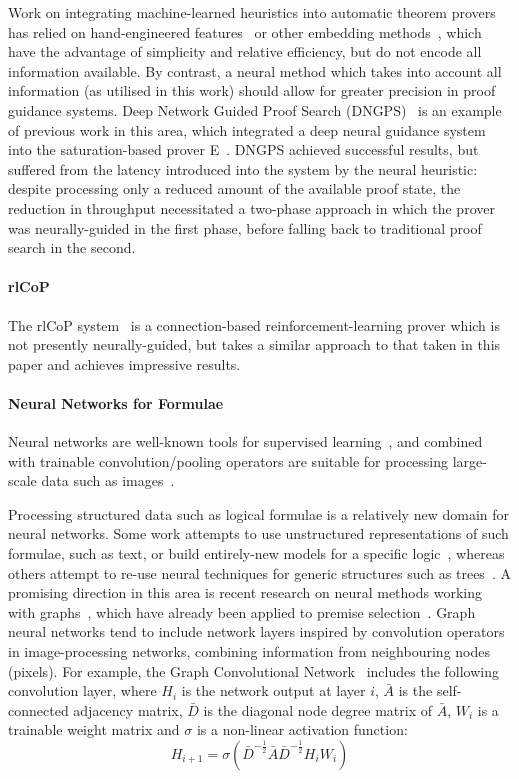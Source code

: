 \documentclass{llncs}
\begin{document}
Work on integrating machine-learned heuristics into automatic theorem provers has relied on hand-engineered features~\cite{MaLeCoP,FEMaLeCoP,rlCoP} or other embedding methods~\cite{ENIGMA}, which have the advantage of simplicity and relative efficiency, but do not encode all information available.
By contrast, a neural method which takes into account all information (as utilised in this work) should allow for greater precision in proof guidance systems.
Deep Network Guided Proof Search (DNGPS)~\cite{DNGPS} is an example of previous work in this area, which integrated a deep neural guidance system into the saturation-based prover E~\cite{E}.
DNGPS achieved successful results, but suffered from the latency introduced into the system by the neural heuristic: despite processing only a reduced amount of the available proof state, the reduction in throughput necessitated a two-phase approach in which the prover was neurally-guided in the first phase, before falling back to traditional proof search in the second.

\paragraph{rlCoP} The rlCoP system~\cite{rlCoP} is a connection-based reinforcement-learning prover which is not presently neurally-guided, but takes a similar approach to that taken in this paper and achieves impressive results.

\paragraph{Neural Networks for Formulae}
Neural networks are well-known tools for supervised learning~\cite{neural-survey}, and combined with trainable convolution/pooling operators are suitable for processing large-scale data such as images~\cite{cnn}.

Processing structured data such as logical formulae is a relatively new domain for neural networks.
Some work attempts to use unstructured representations of such formulae, such as text, or build entirely-new models for a specific logic~\cite{logical-entailment}, whereas others attempt to re-use neural techniques for generic structures such as trees~\cite{logical-tree}.
A promising direction in this area is recent research on neural methods working with graphs~\cite{graph-cnn,gcn,gcn-relational}, which have already been applied to premise selection~\cite{formula-graph}.
Graph neural networks tend to include network layers inspired by convolution operators in image-processing networks, combining information from neighbouring nodes (pixels).
For example, the Graph Convolutional Network~\cite{gcn} includes the following convolution layer, where \(H_i\) is the network output at layer \(i\), \(\bar{A}\) is the self-connected adjacency matrix, \(\bar{D}\) is the diagonal node degree matrix of \(\bar{A}\), \(W_i\) is a trainable weight matrix and \(\sigma\) is a non-linear activation function:
\[
	H_{i + 1} = \sigma\left(\bar{D}^{-\frac{1}{2}}\bar{A}\bar{D}^{-\frac{1}{2}}H_iW_i\right)
\]
\end{document}
